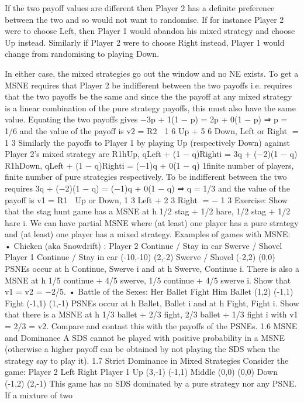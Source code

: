 If the two payoff values are different then Player 2 has a definite preference between the two and so would not want to randomise. If for instance Player 2 were to choose Left, then Player 1 would abandon his mixed strategy and choose Up instead. Similarly if Player 2
were to choose Right instead, Player 1 would change from randomising to playing Down.

In either case, the mixed strategies go out the window and no NE exists. To get a MSNE requires that Player 2 be indifferent between the two payoffs i.e. requires that the two payoffs be the same and since the the payoff at any mixed strategy is a linear combination
of the pure strategy payoffs, this must also have the same value. Equating the two payoffs
gives
−3p + 1(1 − p) = 2p + 0(1 − p)
⇒ p = 1/6
and the value of the payoff is
v2 = R2

1
6
Up + 5
6
Down, Left or Right
=
1
3
Similarly the payoffs to Player 1 by playing Up (respectively Down) against Player 2’s
mixed strategy are
R1hUp, qLeft + (1 − q)Righti = 3q + (−2)(1 − q)
R1hDown, qLeft + (1 − q)Righti = (−1)q + 0(1 − q)
1finite number of players, finite number of pure strategies
respectively. To be indifferent between the two requires
3q + (−2)(1 − q) = (−1)q + 0(1 − q)
⇒ q = 1/3
and the value of the payoff is
v1 = R1

Up or Down,
1
3
Left + 2
3
Right
= −
1
3
Exercise: Show that the stag hunt game has a MSNE at h 1/2 stag + 1/2 hare, 1/2 stag
+ 1/2 hare i.
We can have partial MSNE where (at least) one player has a pure strategy and (at least)
one player has a mixed strategy.
Examples of games with MSNE:
• Chicken (aka Snowdrift) :
Player 2
Continue / Stay in car Swerve / Shovel
Player 1 Continue / Stay in car (-10,-10) (2,-2)
Swerve / Shovel (-2,2) (0,0)
PSNEs occur at h Continue, Swerve i and at h Swerve, Continue i. There is also
a MSNE at h 1/5 continue + 4/5 swerve, 1/5 continue + 4/5 swerve i. Show that
v1 = v2 = −2/5.
• Battle of the Sexes:
Her
Ballet Fight
Him Ballet (1,2) (-1,1)
Fight (-1,1) (1,-1)
PSNEs occur at h Ballet, Ballet i and at h Fight, Fight i. Show that there is a
MSNE at h 1/3 ballet + 2/3 fight, 2/3 ballet + 1/3 fight i with v1 = 2/3 = v2.
Compare and contast this with the payoffs of the PSNEs.
1.6 MSNE and Dominance
A SDS cannot be played with positive probability in a MSNE (otherwise a higher payoff
can be obtained by not playing the SDS when the strategy say to play it).
1.7 Strict Dominance in Mixed Strategies
Consider the game:
Player 2
Left Right
Player 1
Up (3,-1) (-1,1)
Middle (0,0) (0,0)
Down (-1,2) (2,-1)
This game has no SDS dominated by a pure strategy nor any PSNE. If a mixture of two
